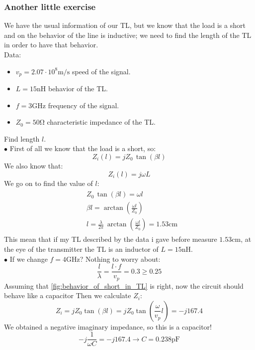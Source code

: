 \subsubsection*{Another little exercise}
We have the usual information of our TL, but we know that the load is a short and on the behavior of the line is inductive; we need to find the length of the TL in order to have that behavior.\\
Data:
\begin{itemize}
    \item $v_p=2.07\cdot 10^{8}\si{\metre \per \second}$ speed of the signal.
    \item $L=15\si{\nano\henry}$ behavior of the TL.
    \item $f=3\si{\giga\hertz}$ frequency of the signal.
    \item $Z_0=50\si{\ohm}$ characteristic impedance of the TL.
\end{itemize}
Find length $l$.\\
$\bullet$ First of all we know that the load is a short, so:
\begin{equation*}
    Z_i(l)=jZ_0\, \tan(\beta l)
\end{equation*}
We also know that:
\begin{equation*}
    Z_i(l)=j\omega L
\end{equation*}
We go on to find the value of $l$:
\begin{align*}
    \begin{split}
      &Z_0\,\tan(\beta l)=\omega l\\[5pt]
      &\beta l=\arctan(\frac{\omega l}{Z_0})\\[5pt]
      &l=\frac{\lambda}{2\pi}\,\arctan(\frac{\omega l}{Z_0})=1.53\si{\centi\metre}
    \end{split}
\end{align*}
This mean that if my TL described by the data i gave before measure $1.53\si{\centi\metre}$, at the eye of the transmitter the TL is an inductor of $L=15\si{\nano\henry}$.\\
$\bullet$ If we change $f=4\si{\giga\hertz}$? Nothing to worry about:
\begin{equation*}
    \frac{l}{\lambda}=\frac{l\cdot f}{v_p}=0.3\geq 0.25
\end{equation*}
Assuming that \cref{fig:behavior_of_short_in_TL} is right, now the circuit should behave like a capacitor
Then we calculate $Z_i$:
\begin{equation*}
    Z_i=jZ_0\tan(\beta l)=jZ_0\tan(\frac{\omega}{v_p} l)=-j167.4
\end{equation*}
We obtained a negative imaginary impedance, so this is a capacitor!
\begin{equation*}
    -j\frac{1}{\omega C}=-j167.4 \rightarrow C=0.238\si{\pico\farad}
\end{equation*}
